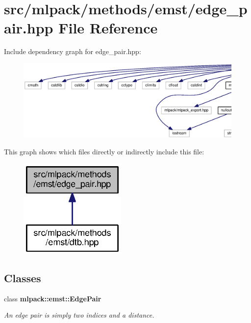 \section{src/mlpack/methods/emst/edge\+\_\+pair.hpp File Reference}
\label{edge__pair_8hpp}
Include dependency graph for edge\+\_\+pair.\+hpp\+:
\nopagebreak
\begin{figure}[H]
\begin{center}
\leavevmode
\includegraphics[width=350pt]{edge__pair_8hpp__incl}
\end{center}
\end{figure}
This graph shows which files directly or indirectly include this file\+:
\nopagebreak
\begin{figure}[H]
\begin{center}
\leavevmode
\includegraphics[width=149pt]{edge__pair_8hpp__dep__incl}
\end{center}
\end{figure}
\subsection*{Classes}
\begin{DoxyCompactItemize}
\item 
class {\bf mlpack\+::emst\+::\+Edge\+Pair}
\begin{DoxyCompactList}\small\item\em An edge pair is simply two indices and a distance. \end{DoxyCompactList}\end{DoxyCompactItemize}
